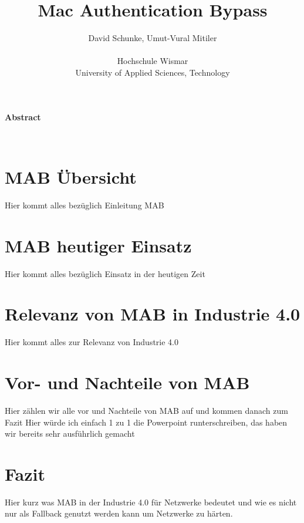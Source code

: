 \documentclass[12pt,oneside,a4paper]{article}
\begin{document}
\title{Mac Authentication Bypass}
\begin{tiny}
\author{David Schunke, Umut-Vural Mitiler \\
\\
Hochschule Wismar \\
University of Applied Sciences, Technology
}
\end{tiny}
\date{} 

\maketitle 


\begin{center}
\textbf{Abstract}\\
\end{center}
\\


\section{MAB Übersicht}
Hier kommt alles bezüglich Einleitung MAB


\section{MAB heutiger Einsatz}
Hier kommt alles bezüglich Einsatz in der heutigen Zeit


\section{Relevanz von MAB in Industrie 4.0}
Hier kommt alles zur Relevanz von Industrie 4.0

\section{Vor- und Nachteile von MAB}
Hier zählen wir alle vor und Nachteile von MAB auf und kommen danach zum Fazit
Hier würde ich einfach 1 zu 1 die Powerpoint runterschreiben, das haben wir bereits sehr ausführlich gemacht

\section{Fazit}
Hier kurz was MAB in der Industrie 4.0 für Netzwerke bedeutet und wie es nicht nur als Fallback genutzt werden kann um Netzwerke zu härten.







\begin{thebibliography}{unsrt}

\end{thebibliography}
 
\end{document}
